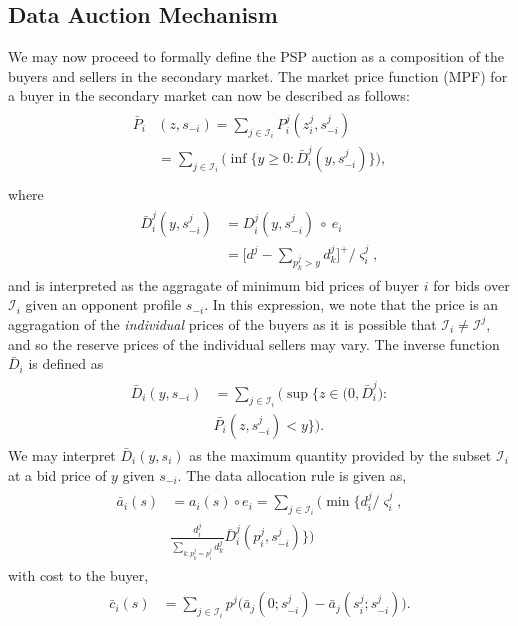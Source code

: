 \documentclass[12pt]{article}
\theoremstyle{definition}
\newcommand{\vs}{\varsigma}
\newcommand{\mcI}{\mathcal{I}}
\begin{document}
\begin{multicols}{2}
\subsection{Data Auction Mechanism}\label{mechanism}
We may now proceed to formally define the PSP auction as a composition of the
buyers and sellers in the secondary market. 
The market price function (MPF) for a buyer in the secondary market
can now be described as follows:
\begin{align}\label{dataprice}
\begin{split}
    \bar{P}_i&(z, s_{-i}) =\displaystyle\sum_{j\in\mcI_i}P_i^j(z_i^j,
s_{-i}^j) \\
    &= \sum_{j\in\mcI_i}\bigg(\inf\bigg\lbrace y\ge 0 : 
    {\bar{D}_i^j}(y,s_{-i}^j)\bigg\rbrace \bigg),\\
\end{split}
\end{align}
where
\begin{align}
\begin{split}\label{datacomposed}
    \bar{D}_i^j(y,s_{-i}^j) &= D_i^j(y,s_{-i}^j)\ \circ\ e_i\\
    &= \bigg\lbrack d^j - \sum_{p_k^j> y} d_k^j\bigg\rbrack^+/\vs_i^j,
\end{split}
\end{align}
and is interpreted as the aggragate of minimum bid prices of buyer $i$ for bids
over $\mcI_i$ given an opponent profile $s_{-i}$. In this expression, we note that
the price is an aggragation of the \emph{individual} prices of the buyers as it is
possible that $\mcI_i \ne \mcI^j$, and so the reserve prices of the individual sellers
may vary. 
The inverse function
$\bar{D}_i$ is defined as
\begin{align}\label{datapriceinverse}
\begin{split}
    \bar{D}_i(y, s_{-i}) &= \displaystyle\sum_{j\in\mcI_i}\bigg(\sup\bigg\lbrace z\in \big( 0,
\bar{D}_i^j \big) : \\
    &\bar{P_i}(z,s_{-i}^j) < y\bigg\rbrace\bigg).
\end{split}
\end{align}
We may interpret $\bar{D}_i(y, s_i)$ as the maximum quantity provided by the subset
$\mcI_i$ at a bid price of $y$ given $s_{-i}$. 
The data allocation rule is given as,
\begin{align}\label{dataallocation}
\begin{split}
    \bar{a}_i(s) &= a_i(s) \circ e_i =
\displaystyle\sum_{j\in\mcI_i}\bigg(\min\bigg\lbrace d_i^j/\vs_i^j,
\\
    &\frac{d_i^j}{\sum_{k:p_k^j=
p_i^j}d_k^j}
\bar{D}_i^j(p_i^j,s_{-i}^j)\bigg\rbrace\bigg)
\end{split}
\end{align}
with cost to the buyer,
\begin{align}\label{datacost}
\begin{split}
    \bar{c}_i(s) &= \displaystyle\sum_{j\in\mcI_i} 
p^j \bigg(\bar{a}_j(0; s_{-i}^j)
    -\bar{a}_j(s_i^j;s_{-i}^j)\bigg).
\end{split}
\end{align}



\end{multicols}
\end{document}
